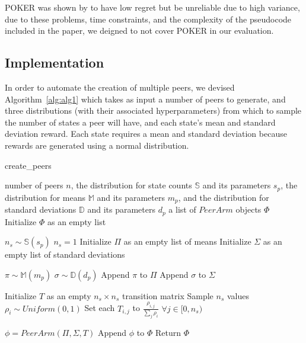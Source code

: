\documentclass{article}
\begin{document}


POKER was shown by \cite{muMAB_wireless} to have low regret but be unreliable due to high variance, due to these problems, time constraints, and the complexity of the 
pseudocode included in the paper, we deigned to not cover POKER in our evaluation.


\subsection{Implementation}
In order to automate the creation of multiple peers, we devised Algorithm~\ref{alg:alg1} which takes as input a number of peers to generate, and three distributions (with 
their associated hyperparameters) from which to sample the number of states a peer will have, and each state's mean and standard deviation reward. Each state requires a 
mean and standard deviation because rewards are generated using a normal distribution. 

\begin{algorithm}[tb]
    \caption{create\_peers}
    \label{alg:alg1}
\begin{algorithmic}
     number of peers $n$, the distribution for state counts $\mathbb{S}$ and its parameters $s_p$, the distribution for means $\mathbb{M}$ and 
    its parameters $m_p$, and the distribution for standard deviations $\mathbb{D}$ and its parameters $d_p$
     a list of $PeerArm$ objects $\Phi$
    \STATE Initialize $\Phi$ as an empty list
    
    \STATE $n_s \sim \mathbb{S}(s_p)$
    \STATE $n_s = 1$
    \ENDIF
    \STATE Initialize $\Pi$ as an empty list of means
    \STATE Initialize $\Sigma$ as an empty list of standard deviations

    \STATE $\pi \sim \mathbb{M}(m_p)$
    \STATE $\sigma \sim \mathbb{D}(d_p)$
    \STATE Append $\pi$ to $\Pi$
    \STATE Append $\sigma$ to $\Sigma$
    \ENDFOR

    \STATE Initialize $T$ as an empty $n_s \times n_s$ transition matrix
    \STATE Sample $n_s$ values $\rho_i \sim Uniform(0, 1)$
    \STATE Set each $T_{i,j}$ to $\frac{\rho_{i,j}}{\sum_j\rho_i}$ $\forall j \in [0, n_s)$
    \ENDFOR

    \STATE $\phi = PeerArm(\Pi, \Sigma, T)$
    \STATE Append $\phi$ to $\Phi$
    \ENDFOR
    \STATE Return $\Phi$
\end{algorithmic}
\end{algorithm}
\end{document}
